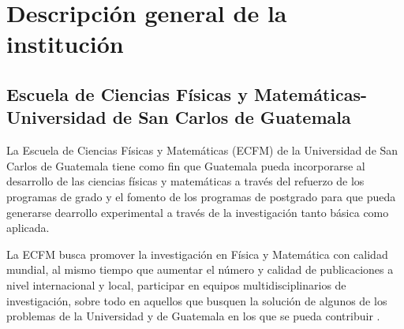\section{Descripción general de la institución}

\begin{comment}
\subsection{Escuela de Ciencias Físicas y Matemáticas - Universidad      de San	Carlos de Guatemala}


El Instituto de Investigación de Ciencias Físicas y Matemáticas (IFIM) es la unidad de la Escuela de Ciencias Físicas y Matemáticas de la Universidad de San Carlos (ECFM) que promueve y realiza estudios avanzados en áreas científicas, fundamentales y aplicadas, de las ciencias físicas y matemáticas.  El IFIM trabaja en la investigación de ciencia básica y aplicada. Se encarga de promover la investigación en estas en el ámbito universitario, de difundir y divulgar del conocimiento generado por la investigación en ciencias físicas y matemáticas, así como también de actualizar programas académicos de ciencias físicas y matemáticas.


Las principales áreas y líneas de investigación son: Física de altas energías, cosmología y astrofísica, Ciencias no lineales y sistemas complejos, Geofísica, Física experimental y Física de radiaciones.

\end{comment}



\subsection{Escuela de Ciencias Físicas y Matemáticas-Universidad de San Carlos de Guatemala}

La Escuela de Ciencias Físicas y Matemáticas (ECFM) de la Universidad de San Carlos de Guatemala tiene como fin que Guatemala pueda incorporarse al desarrollo de las ciencias físicas y matemáticas a través del refuerzo de los programas de grado y el fomento de los programas de postgrado para que pueda generarse dearrollo experimental a través de la investigación tanto básica como aplicada.

La ECFM busca promover la investigación en Física y Matemática con calidad mundial, al mismo tiempo que aumentar el número y calidad  de publicaciones a nivel internacional y local, participar en equipos multidisciplinarios de investigación, sobre todo en aquellos que busquen la solución de algunos de los problemas de la Universidad y de Guatemala en los que se pueda contribuir \cite{ECFM}. 



